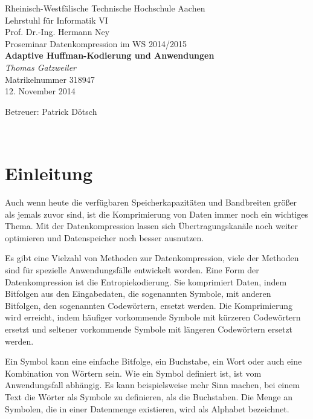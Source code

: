 \documentclass[twoside,11pt,a4paper]{article}
\theoremstyle{break}
\begin{document}

\pagestyle{empty}
\begin{center}
    Rheinisch-Westfälische Technische Hochschule Aachen \\
    Lehrstuhl für Informatik VI \\
    Prof. Dr.-Ing. Hermann Ney\\[6ex]
    Proseminar Datenkompression im WS 2014/2015\\[12ex]

    \LARGE
    \textbf{Adaptive Huffman-Kodierung und Anwendungen} \\[6ex]
    \textit{Thomas Gatzweiler} \\[6ex]
    \Large
    Matrikelnummer 318947 \\[6ex]
    12. November 2014

    \vfill
    \Large Betreuer: Patrick Dötsch
\end{center}

\newpage
\
\newpage

\pagestyle{headings}
\tableofcontents
\listoftables
\listoffigures
\newpage
\pagestyle{empty}
\newpage
\pagestyle{headings}


\newcommand{\sectionbreak}{\clearpage}

\nocite{*}

\section{Einleitung}
Auch wenn heute die verfügbaren Speicherkapazitäten und Bandbreiten
größer als jemals zuvor sind, ist die Komprimierung von Daten immer
noch ein wichtiges Thema. Mit der Datenkompression lassen sich
Übertragungskanäle noch weiter optimieren und Datenspeicher noch
besser ausnutzen.

Es gibt eine Vielzahl von Methoden zur Datenkompression, viele der
Methoden sind für spezielle Anwendungsfälle entwickelt worden. Eine
Form der Datenkompression ist die Entropiekodierung. Sie komprimiert
Daten, indem Bitfolgen aus den Eingabedaten, die sogenannten Symbole,
mit anderen Bitfolgen, den sogenannten Codewörtern, ersetzt
werden. Die Komprimierung wird erreicht, indem häufiger vorkommende
Symbole mit kürzeren Codewörtern ersetzt und seltener vorkommende
Symbole mit längeren Codewörtern ersetzt werden.

Ein Symbol kann eine einfache Bitfolge, ein Buchstabe, ein Wort
oder auch eine Kombination von Wörtern sein. Wie ein Symbol definiert
ist, ist vom Anwendungsfall abhängig. Es kann beispielsweise mehr Sinn
machen, bei einem Text die Wörter als Symbole zu definieren, als die
Buchstaben. Die Menge an Symbolen, die in einer Datenmenge existieren,
wird als Alphabet bezeichnet.
\end{document}
